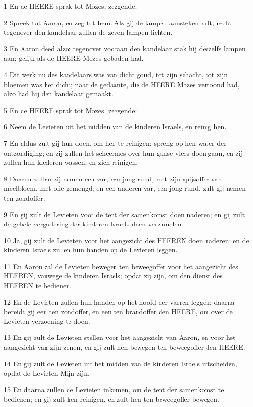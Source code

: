 \par 1 En de HEERE sprak tot Mozes, zeggende:
\par 2 Spreek tot Aaron, en zeg tot hem: Als gij de lampen aansteken zult, recht tegenover den kandelaar zullen de zeven lampen lichten.
\par 3 En Aaron deed alzo: tegenover vooraan den kandelaar stak hij deszelfs lampen aan; gelijk als de HEERE Mozes geboden had.
\par 4 Dit werk nu des kandelaars was van dicht goud, tot zijn schacht, tot zijn bloemen was het dicht; naar de gedaante, die de HEERE Mozes vertoond had, alzo had hij den kandelaar gemaakt.
\par 5 En de HEERE sprak tot Mozes, zeggende:
\par 6 Neem de Levieten uit het midden van de kinderen Israels, en reinig hen.
\par 7 En aldus zult gij hun doen, om hen te reinigen: spreng op hen water der ontzondiging; en zij zullen het scheermes over hun ganse vlees doen gaan, en zij zullen hun klederen wassen, en zich reinigen.
\par 8 Daarna zullen zij nemen een var, een jong rund, met zijn spijsoffer van meelbloem, met olie gemengd; en een anderen var, een jong rund, zult gij nemen ten zondoffer.
\par 9 En gij zult de Levieten voor de tent der samenkomst doen naderen; en gij zult de gehele vergadering der kinderen Israels doen verzamelen.
\par 10 Ja, gij zult de Levieten voor het aangezicht des HEEREN doen naderen; en de kinderen Israels zullen hun handen op de Levieten leggen.
\par 11 En Aaron zal de Levieten bewegen ten beweegoffer voor het aangezicht des HEEREN, vanwege de kinderen Israels; opdat zij zijn, om den dienst des HEEREN te bedienen.
\par 12 En de Levieten zullen hun handen op het hoofd der varren leggen; daarna bereidt gij een ten zondoffer, en een ten brandoffer den HEERE, om over de Levieten verzoening te doen.
\par 13 En gij zult de Levieten stellen voor het aangezicht van Aaron, en voor het aangezicht van zijn zonen, en gij zult hen bewegen ten beweegoffer den HEERE.
\par 14 En gij zult de Levieten uit het midden van de kinderen Israels uitscheiden, opdat de Levieten Mijn zijn.
\par 15 En daarna zullen de Levieten inkomen, om de tent der samenkomst te bedienen; en gij zult hen reinigen, en zult hen ten beweegoffer bewegen.
